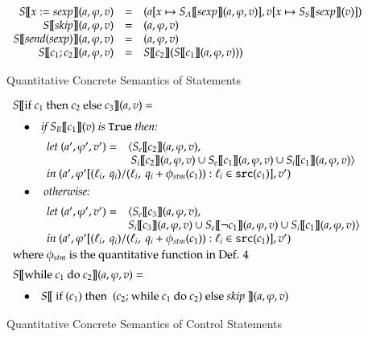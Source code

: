 \documentclass{llncs}
\begin{document}
\begin{figure}[H]
{\small \[
\begin{array}{rcl}
S [\![x := sexp ]\!](a, \varphi, v) & = & (a[x \mapsto S_A [\![sexp ]\!](a, \varphi, v)], v[x \mapsto S_S [\![sexp ]\!](v)]) \\
S [\![skip]\!](a, \varphi, v) & = & (a, \varphi, v) \\
S [\![send(sexp)]\!](a, \varphi, v) & = & (a, \varphi, v) \\
S [\![c_1 ; c_2 ]\!](a, \varphi, v) & = &  S [\![c_2 ]\!](S [\![c_1 ]\!](a, \varphi, v) )) \\ 
\end{array}\\
\]}
\caption{Quantitative Concrete Semantics of Statements}
\label{quant_sem_stm}
\end{figure}

\begin{figure}[H]
{\small \[
\begin{array}{ll}
\multicolumn{2}{l}{S [\![\mbox{if } c_1 \mbox{ then } c_2  \mbox{ else }c_3 ]\!](a, v) = }\\ [0.25cm]
\quad\bullet & \textit{if } S_B [\![c_1]\!](v) \textit{ is }\texttt{True}\textit{ then:}\\[0.2cm]
& \begin{array}{ll}
\textit{let }(a', \varphi', v')  = & \langle S_e [\![c_2 ]\!](a, \varphi, v),\ \\
& \ S_i [\![c_2 ]\!](a, \varphi, v) \cup S_e [\![c_1 ]\!](a, \varphi, v) \cup S_i [\![c_1 ]\!](a, \varphi, v) \rangle \\
\multicolumn{2}{l}{\textit{in } (a', \varphi'[(\ell_i,\ q_i)/(\ell_i,\ q_i+\phi_{stm} (c_1)): \ell_i \in \texttt{src}(c_1)], v') }\\
\end{array}\\[0.55cm]
\quad\bullet & \textit{ otherwise:}\\ [0.2cm]
& \begin{array}{ll}
\textit{let }(a', \varphi', v')  = & \langle S_e [\![c_3 ]\!](a, \varphi, v),\ \\
& S_i [\![c_3 ]\!](a, \varphi, v) \cup S_e [\![\neg c_1 ]\!](a, \varphi, v) \cup S_i [\![c_1 ]\!](a, \varphi, v) \rangle \\
\multicolumn{2}{l}{\textit{in } (a', \varphi'[(\ell_i,\ q_i)/(\ell_i,\ q_i+\phi_{stm} (c_1)): \ell_i \in \texttt{src}(c_1)], v')  }\\
\end{array}\\[0.5cm]
\multicolumn{2}{l}{\text{where } \phi_{stm} \text{ is the quantitative function in Def. 4} }\\[0.2cm]
\multicolumn{2}{l}{S [\![\mbox{while } c_1 \mbox{ do } c_2]\!](a, \varphi, v)  = }\\[0.25cm]
\quad\bullet & S [\![\mbox{ if } (c_1) \mbox{ then } \mbox{ (}c_2\mbox{; while } c_1 \mbox{ do } c_2 ) \mbox{ else \textit{skip} }]\!](a, \varphi, v)\\
\end{array}
\]}
\caption{Quantitative Concrete Semantics of Control Statements}
\label{quant_sem_cstm}
\end{figure}
\end{document}
